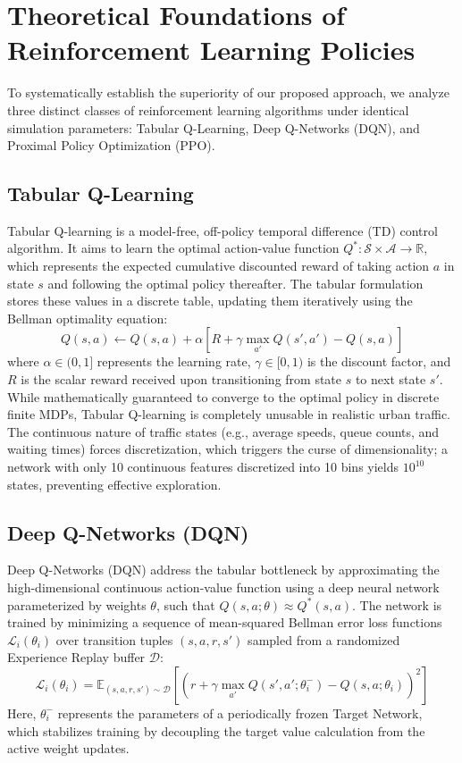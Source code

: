 \documentclass[conference]{IEEEtran}
\begin{document}
\section{Theoretical Foundations of Reinforcement Learning Policies}
To systematically establish the superiority of our proposed approach, we analyze three distinct classes of reinforcement learning algorithms under identical simulation parameters: Tabular Q-Learning, Deep Q-Networks (DQN), and Proximal Policy Optimization (PPO).

\subsection{Tabular Q-Learning}
Tabular Q-learning is a model-free, off-policy temporal difference (TD) control algorithm. It aims to learn the optimal action-value function $Q^*: \mathcal{S} \times \mathcal{A} \rightarrow \mathbb{R}$, which represents the expected cumulative discounted reward of taking action $a$ in state $s$ and following the optimal policy thereafter. The tabular formulation stores these values in a discrete table, updating them iteratively using the Bellman optimality equation:
\begin{equation}
Q(s, a) \leftarrow Q(s, a) + \alpha \left[ R + \gamma \max_{a'} Q(s', a') - Q(s, a) \right]
\end{equation}
where $\alpha \in (0, 1]$ represents the learning rate, $\gamma \in [0, 1)$ is the discount factor, and $R$ is the scalar reward received upon transitioning from state $s$ to next state $s'$. While mathematically guaranteed to converge to the optimal policy in discrete finite MDPs, Tabular Q-learning is completely unusable in realistic urban traffic. The continuous nature of traffic states (e.g., average speeds, queue counts, and waiting times) forces discretization, which triggers the curse of dimensionality; a network with only 10 continuous features discretized into 10 bins yields $10^{10}$ states, preventing effective exploration.

\subsection{Deep Q-Networks (DQN)}
Deep Q-Networks (DQN) address the tabular bottleneck by approximating the high-dimensional continuous action-value function using a deep neural network parameterized by weights $\theta$, such that $Q(s, a; \theta) \approx Q^*(s, a)$. The network is trained by minimizing a sequence of mean-squared Bellman error loss functions $\mathcal{L}_i(\theta_i)$ over transition tuples $(s, a, r, s')$ sampled from a randomized Experience Replay buffer $\mathcal{D}$:
\begin{equation}
\mathcal{L}_i(\theta_i) = \mathbb{E}_{(s, a, r, s') \sim \mathcal{D}} \left[ \left( r + \gamma \max_{a'} Q(s', a'; \theta_i^-) - Q(s, a; \theta_i) \right)^2 \right]
\end{equation}
Here, $\theta_i^-$ represents the parameters of a periodically frozen Target Network, which stabilizes training by decoupling the target value calculation from the active weight updates. 
\end{document}
